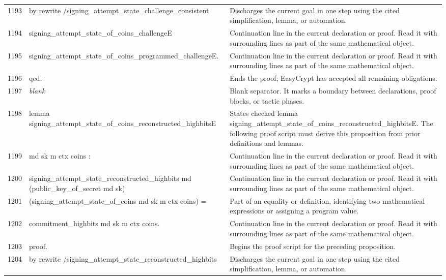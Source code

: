 \documentclass[10pt]{article}
\begin{document}
\begin{longtable}{r L{0.53\textwidth} L{0.37\textwidth}}
1193 & {\ttfamily\scriptsize by rewrite /signing\_attempt\_state\_challenge\_consistent} & Discharges the current goal in one step using the cited simplification, lemma, or automation. \\
1194 & {\ttfamily\scriptsize            signing\_attempt\_state\_of\_coins\_challengeE} & Continuation line in the current declaration or proof.  Read it with surrounding lines as part of the same mathematical object. \\
1195 & {\ttfamily\scriptsize            signing\_attempt\_state\_of\_coins\_programmed\_challengeE.} & Continuation line in the current declaration or proof.  Read it with surrounding lines as part of the same mathematical object. \\
1196 & {\ttfamily\scriptsize qed.} & Ends the proof; EasyCrypt has accepted all remaining obligations. \\
1197 & {\ttfamily\scriptsize \emph{blank}} & Blank separator.  It marks a boundary between declarations, proof blocks, or tactic phases. \\
1198 & {\ttfamily\scriptsize lemma signing\_attempt\_state\_of\_coins\_reconstructed\_highbitsE} & States checked lemma signing\_attempt\_state\_of\_coins\_reconstructed\_highbitsE.  The following proof script must derive this proposition from prior definitions and lemmas. \\
1199 & {\ttfamily\scriptsize    md sk m ctx coins :} & Continuation line in the current declaration or proof.  Read it with surrounding lines as part of the same mathematical object. \\
1200 & {\ttfamily\scriptsize   signing\_attempt\_state\_reconstructed\_highbits md (public\_key\_of\_secret md sk)} & Continuation line in the current declaration or proof.  Read it with surrounding lines as part of the same mathematical object. \\
1201 & {\ttfamily\scriptsize     (signing\_attempt\_state\_of\_coins md sk m ctx coins) =} & Part of an equality or definition, identifying two mathematical expressions or assigning a program value. \\
1202 & {\ttfamily\scriptsize   commitment\_highbits md sk m ctx coins.} & Continuation line in the current declaration or proof.  Read it with surrounding lines as part of the same mathematical object. \\
1203 & {\ttfamily\scriptsize proof.} & Begins the proof script for the preceding proposition. \\
1204 & {\ttfamily\scriptsize by rewrite /signing\_attempt\_state\_reconstructed\_highbits} & Discharges the current goal in one step using the cited simplification, lemma, or automation. \\

\end{longtable}
\end{document}
